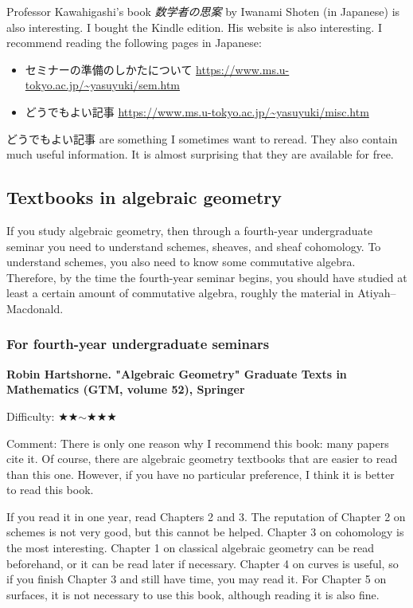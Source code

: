 Professor Kawahigashi's book \emph{数学者の思案} by Iwanami Shoten (in Japanese) is also interesting. I bought the Kindle edition. His website is also interesting. I recommend reading the following pages in Japanese:
\begin{itemize}[left=0pt]
  \setlength{\parskip}{0cm} %
  \setlength{\itemsep}{0cm} %
\item セミナーの準備のしかたについて \url{https://www.ms.u-tokyo.ac.jp/~yasuyuki/sem.htm}
\item どうでもよい記事 \url{https://www.ms.u-tokyo.ac.jp/~yasuyuki/misc.htm}
\end{itemize}
どうでもよい記事 are something I sometimes want to reread. They also contain much useful information. It is almost surprising that they are available for free.

\subsection{Textbooks in algebraic geometry}

If you study algebraic geometry, then through a fourth-year undergraduate seminar you need to understand schemes, sheaves, and sheaf cohomology. To understand schemes, you also need to know some commutative algebra. Therefore, by the time the fourth-year seminar begins, you should have studied at least a certain amount of commutative algebra, roughly the material in Atiyah--Macdonald.

\subsubsection{For fourth-year undergraduate seminars}

\textbf{Robin Hartshorne. "Algebraic Geometry" Graduate Texts in Mathematics (GTM, volume 52), Springer} \vspace{-6pt}

Difficulty: ★★$\sim$★★★  \vspace{-6pt}

Comment: There is only one reason why I recommend this book: many papers cite it. Of course, there are algebraic geometry textbooks that are easier to read than this one. However, if you have no particular preference, I think it is better to read this book.

If you read it in one year, read Chapters 2 and 3. The reputation of Chapter 2 on schemes is not very good, but this cannot be helped. Chapter 3 on cohomology is the most interesting. Chapter 1 on classical algebraic geometry can be read beforehand, or it can be read later if necessary. Chapter 4 on curves is useful, so if you finish Chapter 3 and still have time, you may read it. For Chapter 5 on surfaces, it is not necessary to use this book, although reading it is also fine.
\vspace{8pt}

